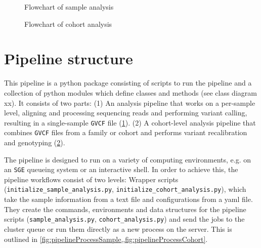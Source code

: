 \documentclass[a4paper]{article}
\begin{document}
\begin{figure}
  \begin{center}
    
    \caption[sanple analysis]{Flowchart of sample analysis}
  \label{fig:sampleAnalysis}
\end{center}
\end{figure}


\begin{figure}
  \begin{center}
    
    \caption[cohort analysis]{Flowchart of cohort analysis}
  \label{fig:cohortAnalysis}
\end{center}
\end{figure}



\section{Pipeline structure}
\label{sec:pipeline-structure}

This pipeline is a python package consisting of scripts to run the
pipeline and a collection of python modules which define classes and
methods (see class diagram xx). It consists of two parts: (1) An
analysis pipeline that works on a per-sample level, aligning and
processing sequencing reads and performing variant calling, resulting
in a single-sample \texttt{GVCF} file
(\cref{fig:sampleAnalysis}). (2) A cohort-level analysis pipeline that
combines \texttt{GVCF} files from a family or cohort and performs
variant recalibration and genotyping (\cref{fig:cohortAnalysis}).

The pipeline is designed to run on a variety of computing
environments, e.g. on an \texttt{SGE} queueing system or an
interactive shell. In order to achieve this, the pipeline workflows
consist of two levels: Wrapper scripts
(\texttt{initialize\_sample\_analysis.py},
\texttt{initialize\_cohort\_analysis.py}), which take the sample
information from a text file and configurations from a yaml file. They
create the commands, environments and data structures for the pipeline
scripts (\texttt{sample\_analysis.py}, \texttt{cohort\_analysis.py})
and send the jobs to the cluster queue or run them directly as a new
process on the server. This is outlined in
\cref{fig:pipelineProcessSample,,fig:pipelineProcessCohort}.
\end{document}
